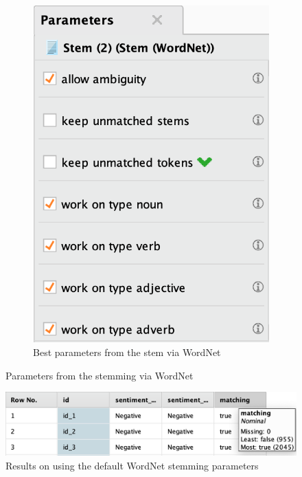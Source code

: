 \documentclass[a4paper]{article}
\begin{document}
\begin{figure}[H]
\begin{subfigure}[b]{0.3\textwidth}
        \includegraphics[width=\textwidth]{imgs/part_3/3_processing_documents_stem_wordnet_params_best}
        \caption{Best parameters from the stem via WordNet}
        \label{fig:3_processing_documents_stem_wordnet_params_best}
    \end{subfigure}
    \caption{Parameters from the stemming via WordNet}
    \label{fig:3_processing_documents_stem_wordnet_params}
\end{figure}
\begin{figure}[H]
	\includegraphics[width=\linewidth]{imgs/part_3/3_processing_documents_with_stem_wordnet_results}
	\caption{Results on using the default WordNet stemming parameters}
	\label{fig:3_processing_documents_with_stem_wordnet_results}
\end{figure}
\end{document}
